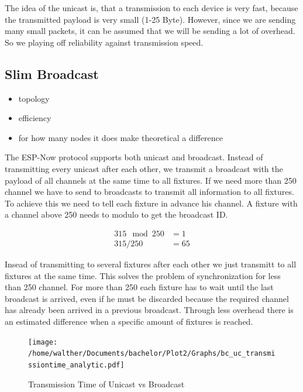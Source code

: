 \documentclass[]{ccs-thesis}
\begin{document}
The idea of the unicast is, that a transmission to each device is very fast, because the transmitted payload is very small (1-25 Byte).
However, since we are sending many small packets, it can be assumed that we will be sending a lot of overhead.
So we playing off reliability against transmission speed.


\subsection{Slim Broadcast}
\begin{itemize}
	\item topology
	\item efficiency
	\item for how many nodes it does make theoretical a difference
\end{itemize}

The ESP-Now protocol supports both unicast and broadcast.
Instead of transmitting every unicast after each other, we transmit a broadcast with the payload of all channels at the same time to all fixtures.
If we need more than 250 channel we have to send to broadcasts to transmit all information to all fixtures.
To achieve this we need to tell each fixture in advance his channel.
A fixture with a channel above 250 needs to modulo to get the broadcast ID.

\begin{align*}
	315 \mod 250 &= 1 \\
	315 / 250 &= 65
\end{align*}

Insead of transmitting to several fixtures after each other we just transmitt to all fixtures at the same time.
This solves the problem of synchronization for less than 250 channel.
For more than 250 each fixture has to wait until the last broadcast is arrived, 
even if he must be discarded because the required channel has already been arrived in a previous broadcast.
Through less overhead there is an estimated difference when a specific amount of fixtures is reached.

\begin{figure}
	\centering
	\texttt{[image: /home/walther/Documents/bachelor/Plot2/Graphs/bc\_uc\_transmissiontime\_analytic.pdf]}
	\caption{Transmission Time of Unicast vs Broadcast}
	\label{fig:bc_uc_transmissiontime_analytic}
\end{figure}
\end{document}
